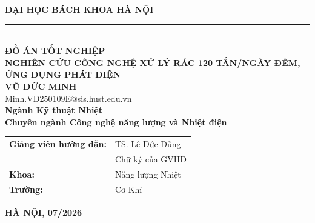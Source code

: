 \documentclass[main.tex]{subfiles}
\begin{document}
\begin{titlepage}
\thispagestyle{empty}
\begin{center}

{\textbf{\large ĐẠI HỌC BÁCH KHOA HÀ NỘI}}\\[0.1cm]
\rule{4cm}{0.4pt}\\[3.4cm]

{\textbf{\huge ĐỒ ÁN TỐT NGHIỆP}}\\[1cm]
{\textbf{\Large NGHIÊN CỨU CÔNG NGHỆ XỬ LÝ RÁC 120 TẤN/NGÀY ĐÊM, ỨNG DỤNG PHÁT ĐIỆN}}\\[0.9cm]

{\textbf{\large VŨ ĐỨC MINH}}\\
{\large Minh.VD250109E@sis.hust.edu.vn}\\[0.5cm]

{\textbf{\large Ngành Kỹ thuật Nhiệt}}\\[0.35cm]
{\textbf{\large Chuyên ngành Công nghệ năng lượng và Nhiệt điện}}\\[3.6cm]

\begin{tabular}{@{}p{5.0cm}p{7.0cm}@{}}
\textbf{Giảng viên hướng dẫn:} & TS. Lê Đức Dũng\hfill\underline{\hspace{3cm}} \\
& \hfill{\footnotesize Chữ ký của GVHD}\\[0.4cm]
\textbf{Khoa:} & Năng lượng Nhiệt \\
\textbf{Trường:} & Cơ Khí \\
\end{tabular}

\vfill
{\textbf{\large HÀ NỘI, 07/2026}}

\end{center}
\end{titlepage}
\end{document}
